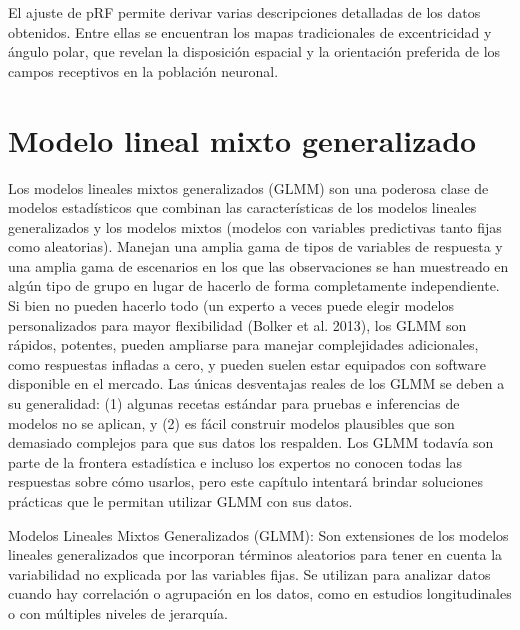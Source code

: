 El ajuste de pRF permite derivar varias descripciones detalladas de los datos obtenidos. Entre ellas se encuentran los mapas tradicionales de excentricidad y ángulo polar, que revelan la disposición espacial y la orientación preferida de los campos receptivos en la población neuronal.


\section{Modelo lineal mixto generalizado}

Los modelos lineales mixtos generalizados (GLMM) son una poderosa clase de modelos estadísticos que combinan las características de los modelos lineales generalizados y los modelos mixtos (modelos con variables predictivas tanto fijas como aleatorias). Manejan una amplia gama de tipos de variables de respuesta y una amplia gama de escenarios en los que las observaciones se han muestreado en algún tipo de grupo en lugar de hacerlo de forma completamente independiente. Si bien no pueden hacerlo todo (un experto a veces puede elegir modelos personalizados para mayor flexibilidad (Bolker et al. 2013), los GLMM son rápidos, potentes, pueden ampliarse para manejar complejidades adicionales, como respuestas infladas a cero, y pueden suelen estar equipados con software disponible en el mercado. Las únicas desventajas reales de los GLMM se deben a su generalidad: (1) algunas recetas estándar para pruebas e inferencias de modelos no se aplican, y (2) es fácil construir modelos plausibles que son demasiado complejos para que sus datos los respalden. Los GLMM todavía son parte de la frontera estadística e incluso los expertos no conocen todas las respuestas sobre cómo usarlos, pero este capítulo intentará brindar soluciones prácticas que le permitan utilizar GLMM con sus datos.


Modelos Lineales Mixtos Generalizados (GLMM): Son extensiones de los modelos lineales generalizados que incorporan términos aleatorios para tener en cuenta la variabilidad no explicada por las variables fijas. Se utilizan para analizar datos cuando hay correlación o agrupación en los datos, como en estudios longitudinales o con múltiples niveles de jerarquía.

